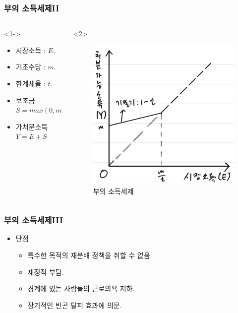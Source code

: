 \documentclass[aspectratio=169,xcolor=dvipsnames,handout]{beamer}
\begin{document}
\begin{frame}
\frametitle{부의 소득세제II}
    \begin{columns}
        \begin{column}{.5\textwidth}<1->
            \begin{itemize}
                \item 시장소득 : $E$.
                \item 기초수당 : $m$.
                \item 한계세율 : $t$.
                \item 보조금 $S= max(0,m-tE)$
                \item 가처분소득 $Y = E + S$
            \end{itemize}
        \end{column}
        \begin{column}{.5\textwidth}<2>
            \begin{figure}
                \centering
                \includegraphics[width=.8\textwidth]{pic/nitax.png}
                \caption{부의 소득세제}
            \end{figure}
        \end{column}
    \end{columns}
\end{frame}

\begin{frame}[<+->]
\frametitle{부의 소득세제III}
    \begin{itemize}
        \item 단점
        \begin{itemize}
            \item 특수한 목적의 재분배 정책을 취할 수 없음.
            \item 재정적 부담.
            \item 경계에 있는 사람들의 근로의욕 저하.
            \item 장기적인 빈곤 탈피 효과에 의문.
        \end{itemize} 
    \end{itemize}
\end{frame}
\end{document}
